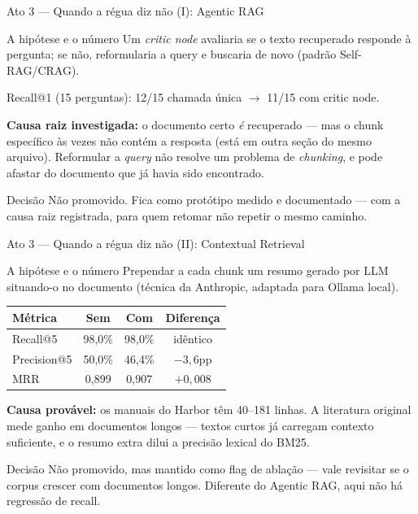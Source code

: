 \documentclass{beamer}
\newenvironment{numerobloco}[1]{\begin{block}{#1}}{\end{block}}
\newenvironment{decisaobloco}[1]{\begin{alertblock}{#1}}{\end{alertblock}}
\begin{document}
\begin{frame}{Ato 3 --- Quando a régua diz não (I): Agentic RAG}
  \small
  \begin{numerobloco}{A hipótese e o número}
    Um \emph{critic node} avaliaria se o texto recuperado responde à pergunta; se não,
    reformularia a query e buscaria de novo (padrão Self-RAG/CRAG).
    \begin{center}
    Recall@1 (15 perguntas): 12/15 chamada única $\to$ \alert{11/15} com critic node.
    \end{center}
  \end{numerobloco}

  \pause
  \textbf{Causa raiz investigada:} o documento certo \emph{é} recuperado --- mas o chunk
  específico às vezes não contém a resposta (está em outra seção do mesmo arquivo).
  Reformular a \emph{query} não resolve um problema de \emph{chunking}, e pode afastar do
  documento que já havia sido encontrado.

  \pause
  \begin{decisaobloco}{Decisão}
    Não promovido. Fica como protótipo medido e documentado --- com a causa raiz
    registrada, para quem retomar não repetir o mesmo caminho.
  \end{decisaobloco}
\end{frame}

\begin{frame}{Ato 3 --- Quando a régua diz não (II): Contextual Retrieval}
  \small
  \begin{numerobloco}{A hipótese e o número}
    Prependar a cada chunk um resumo gerado por LLM situando-o no documento (técnica da
    Anthropic, adaptada para Ollama local).
    \begin{center}
    \begin{tabular}{lccc}
      \toprule
      \textbf{Métrica} & \textbf{Sem} & \textbf{Com} & \textbf{Diferença} \\
      \midrule
      Recall@5    & 98,0\% & 98,0\% & idêntico \\
      Precision@5 & 50,0\% & \alert{46,4\%} & $-3,6$pp \\
      MRR         & 0,899  & 0,907  & $+0,008$ \\
      \bottomrule
    \end{tabular}
    \end{center}
  \end{numerobloco}

  \pause
  \textbf{Causa provável:} os manuais do Harbor têm 40--181 linhas. A literatura original
  mede ganho em documentos longos --- textos curtos já carregam contexto suficiente, e o
  resumo extra dilui a precisão lexical do BM25.

  \pause
  \begin{decisaobloco}{Decisão}
    Não promovido, mas mantido como flag de ablação --- vale revisitar se o corpus crescer
    com documentos longos. Diferente do Agentic RAG, aqui não há regressão de recall.
  \end{decisaobloco}
\end{frame}
\end{document}
